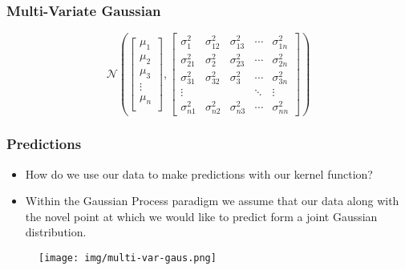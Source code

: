 \documentclass[9pt,hyperref={pdfpagelabels=false},xcolor=table]{beamer}
\begin{document}
\begin{frame}
    \frametitle{Multi-Variate Gaussian}
    \[
        \mathcal{N} \left(
        \begin{bmatrix}
                \mu_1  \\
                \mu_2  \\
                \mu_3  \\
                \vdots \\
                \mu_n  \\
            \end{bmatrix} ,
        \begin{bmatrix}
                \sigma_{1}^2  & \sigma_{12}^2 & \sigma_{13}^2 & \cdots & \sigma_{1n}^2 \\
                \sigma_{21}^2 & \sigma_{2}^2  & \sigma_{23}^2 & \cdots & \sigma_{2n}^2 \\
                \sigma_{31}^2 & \sigma_{32}^2 & \sigma_{3}^2  & \cdots & \sigma_{3n}^2 \\
                \vdots        &               &               & \ddots & \vdots        \\
                \sigma_{n1}^2 & \sigma_{n2}^2 & \sigma_{n3}^2 & \cdots & \sigma_{nn}^2
            \end{bmatrix}
        \right)
    \]
\end{frame}

\begin{frame}
    \frametitle{Predictions}
    \begin{itemize}
        \item How do we use our data to make predictions with our kernel function?
        \item Within the Gaussian Process paradigm we assume that our data along with the novel point at which we would like to predict form a joint Gaussian distribution.
    \end{itemize}
    \begin{figure}
        \centering
        \texttt{[image: img/multi-var-gaus.png]}
    \end{figure}
\end{frame}
\end{document}

